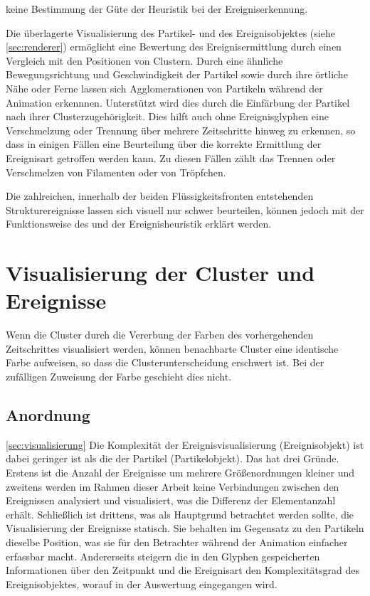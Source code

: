 keine Bestimmung der Güte der Heuristik bei der Ereigniserkennung.

Die überlagerte Visualisierung des Partikel- und des Ereignisobjektes (siehe \autoref{sec:renderer}) ermöglicht eine Bewertung des Ereignisermittlung durch einen Vergleich mit den Positionen von Clustern. Durch eine ähnliche Bewegungsrichtung und Geschwindigkeit der Partikel sowie durch ihre örtliche Nähe oder Ferne lassen sich Agglomerationen von Partikeln während der Animation erkennnen. Unterstützt wird dies durch die Einfärbung der Partikel nach ihrer Clusterzugehörigkeit. Dies hilft auch ohne Ereignisglyphen eine Verschmelzung oder Trennung über mehrere Zeitschritte hinweg zu erkennen, so dass in einigen Fällen eine Beurteilung über die korrekte Ermittlung der Ereignisart getroffen werden kann. Zu diesen Fällen zählt das Trennen oder Verschmelzen von Filamenten oder von Tröpfchen.

Die zahlreichen, innerhalb der beiden Flüssigkeitsfronten entstehenden Strukturereignisse lassen sich visuell nur schwer beurteilen, können jedoch mit der Funktionsweise des \CFD und der Ereignisheuristik erklärt werden. %


\section{Visualisierung der Cluster und Ereignisse}


Wenn die Cluster durch die Vererbung der Farben des vorhergehenden Zeitschrittes visualisiert werden, können benachbarte Cluster eine identische Farbe aufweisen, so dass die Clusterunterscheidung erschwert ist. Bei der zufälligen Zuweisung der Farbe geschieht dies nicht. %

\subsection{Anordnung}

\autoref{sec:visualisierung}
Die Komplexität der Ereignisvisualisierung (Ereignisobjekt) ist dabei geringer ist als die der Partikel (Partikelobjekt). Das hat drei Gründe. Erstens ist die Anzahl der Ereignisse um mehrere Größenordnungen kleiner und zweitens werden im Rahmen dieser Arbeit keine Verbindungen zwischen den Ereignissen analysiert und visualisiert, was die Differenz der Elementanzahl erhält. Schließlich ist drittens, was als Hauptgrund betrachtet werden sollte, die Visualisierung der Ereignisse statisch. Sie behalten im Gegensatz zu den Partikeln dieselbe Position, was sie für den Betrachter während der Animation einfacher erfassbar macht.
Andererseits steigern die in den Glyphen gespeicherten Informationen über den Zeitpunkt und die Ereignisart den Komplexitätsgrad des Ereignisobjektes, worauf in der Auswertung eingegangen wird.

